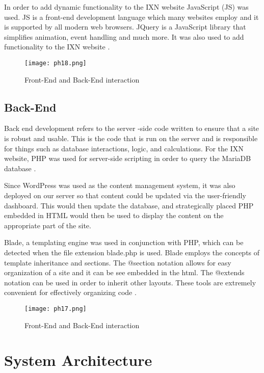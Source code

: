 In order to add dynamic functionality to the IXN website JavaScript (JS)
was used. JS is a front-end development language which many websites
employ and it is supported by all modern web browsers. JQuery is a
JavaScript library that simplifies animation, event handling and much
more. It was also used to add functionality to the IXN website
\cite{p16}.

\begin{figure}[H]
      \centering
      \texttt{[image: ph18.png]}
      \caption{Front-End and Back-End interaction}
 \end{figure}

\hypertarget{back-end}{%
\subsection{Back-End}\label{back-end}}

Back end development refers to the server -side code written to ensure
that a site is robust and usable. This is the code that is run on the
server and is responsible for things such as database interactions,
logic, and calculations. For the IXN website, PHP was used for
server-side scripting in order to query the MariaDB database \cite{p17}
.

Since WordPress was used as the content management system, it was also
deployed on our server so that content could be updated via the
user-friendly dashboard. This would then update the database, and
strategically placed PHP embedded in HTML would then be used to display
the content on the appropriate part of the site.

Blade, a templating engine was used in conjunction with PHP, which can
be detected when the file extension blade.php is used. Blade employs the
concepts of template inheritance and sections. The @section notation
allows for easy organization of a site and it can be see embedded in the
html. The @extends notation can be used in order to inherit other
layouts. These tools are extremely convenient for effectively organizing
code \cite{p18} .

\begin{figure}[H]
      \centering
      \texttt{[image: ph17.png]}
      \caption{Front-End and Back-End interaction}
 \end{figure}

\hypertarget{system-architecture}{%
\section{System Architecture}\label{system-architecture}}

